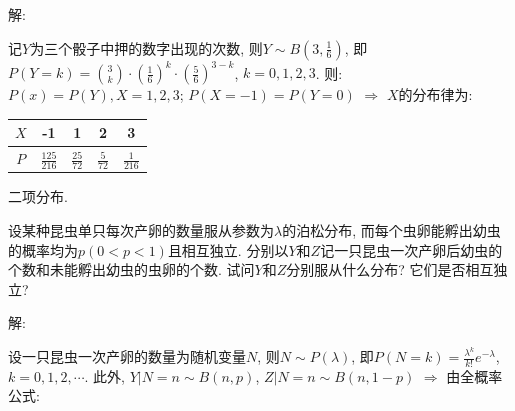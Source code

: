 \documentclass[standard]{ExBook}
\begin{document}
\begin{qitems}
\vspace{-5em}

    \begin{bbox}
解: 

记$Y$为三个骰子中押的数字出现的次数, 则$Y\sim B(3,\displaystyle\frac{1}{6})$, 即$P(Y=k)=\binom{3}{k}\cdot(\displaystyle\frac{1}{6})^{k}\cdot(\frac{5}{6})^{3-k}$, $k=0,1,2,3$. 则: $P(x)=P(Y),X=1,2,3$; $P(X=-1)=P(Y=0)$ $\Longrightarrow$ $X$的分布律为:
\begin{center}
\renewcommand{\arraystretch}{1.5}
\begin{tabular}{c|c|c|c|c}
    \hline
    $X$ & -1 & 1 & 2 & 3 \\
    \hline
    $P$ & $\displaystyle\frac{125}{216}$ & $\displaystyle\frac{25}{72}$ & $\displaystyle\frac{5}{72}$ & $\displaystyle\frac{1}{216}$ \\
    \hline
\end{tabular}
\end{center}
\textcolor{themeColor}{\selectfont {} 二项分布.}
    \end{bbox}

\vspace{-5em}

    \begin{bbox}
    \begin{shaded}
        \qitem
设某种昆虫单只每次产卵的数量服从参数为$\lambda$的泊松分布, 而每个虫卵能孵出幼虫的概率均为$p(0 < p < 1)$且相互独立. 分别以$Y$和$Z$记一只昆虫一次产卵后幼虫的个数和未能孵出幼虫的虫卵的个数. 试问$Y$和$Z$分别服从什么分布? 它们是否相互独立?
    \end{shaded}
    \end{bbox}

\vspace{-5em}

    \begin{bbox}
解: 

设一只昆虫一次产卵的数量为随机变量$N$, 则$N\sim P(\lambda)$, 即$P(N=k)=\displaystyle\frac{\lambda^k}{k!}e^{-\lambda}$, $k=0,1,2,\cdots$. 此外, $Y|N=n\sim B(n,p)$, $Z|N=n\sim B(n,1-p)$ $\Longrightarrow$ 由全概率公式:
    \end{bbox}

\vspace{-5em}


\end{qitems}
\end{document}
